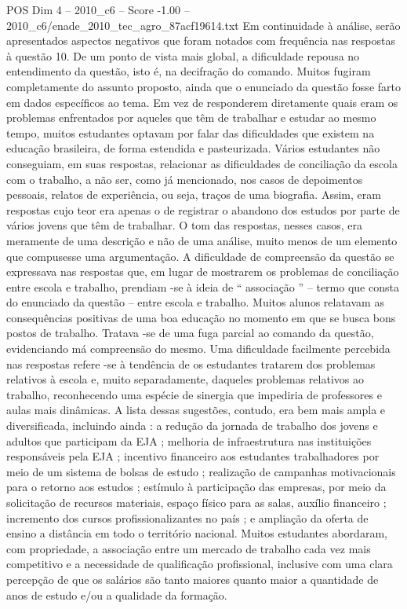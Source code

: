 \begin{textsample}{POS Dim 4 – 2010\_c6 – Score -1.00 – 2010\_c6/enade\_2010\_tec\_agro\_87acf19614.txt}
Em continuidade à análise, serão apresentados aspectos negativos que foram notados com frequência nas respostas à questão 10.
De um ponto de vista mais global, a dificuldade repousa no entendimento da questão, isto é, na decifração do comando.
Muitos fugiram completamente do assunto proposto, ainda que o enunciado da questão fosse farto em dados específicos ao tema.
Em vez de responderem diretamente quais eram os problemas enfrentados por aqueles que têm de trabalhar e estudar ao mesmo tempo, muitos estudantes optavam por falar das dificuldades que existem na educação brasileira, de forma estendida e pasteurizada.
Vários estudantes não conseguiam, em suas respostas, relacionar as dificuldades de conciliação da escola com o trabalho, a não ser, como já mencionado, nos casos de depoimentos pessoais, relatos de experiência, ou seja, traços de uma biografia.
Assim, eram respostas cujo teor era apenas o de registrar o abandono dos estudos por parte de vários jovens que têm de trabalhar.
O tom das respostas, nesses casos, era meramente de uma descrição e não de uma análise, muito menos de um elemento que compusesse uma argumentação.
A dificuldade de compreensão da questão se expressava nas respostas que, em lugar de mostrarem os problemas de conciliação entre escola e trabalho, prendiam -se à ideia de “ associação ” – termo que consta do enunciado da questão – entre escola e trabalho.
Muitos alunos relatavam as consequências positivas de uma boa educação no momento em que se busca bons postos de trabalho.
Tratava -se de uma fuga parcial ao comando da questão, evidenciando má compreensão do mesmo.
Uma dificuldade facilmente percebida nas respostas refere -se à tendência de os estudantes tratarem dos problemas relativos à escola e, muito separadamente, daqueles problemas relativos ao trabalho, reconhecendo uma espécie de sinergia que impediria de professores e aulas mais dinâmicas.
A lista dessas sugestões, contudo, era bem mais ampla e diversificada, incluindo ainda : a redução da jornada de trabalho dos jovens e adultos que participam da EJA ; melhoria de infraestrutura nas instituições responsáveis pela EJA ; incentivo financeiro aos estudantes trabalhadores por meio de um sistema de bolsas de estudo ; realização de campanhas motivacionais para o retorno aos estudos ; estímulo à participação das empresas, por meio da solicitação de recursos materiais, espaço físico para as salas, auxílio financeiro ; incremento dos cursos profissionalizantes no país ; e ampliação da oferta de ensino a distância em todo o território nacional.
Muitos estudantes abordaram, com propriedade, a associação entre um mercado de trabalho cada vez mais competitivo e a necessidade de qualificação profissional, inclusive com uma clara percepção de que os salários são tanto maiores quanto maior a quantidade de anos de estudo e/ou a qualidade da formação.

\end{textsample}
